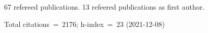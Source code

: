 67 refereed publications. 13 refeered publications as first author.

Total citations~=~2176; h-index~=~23 (2021-12-08)